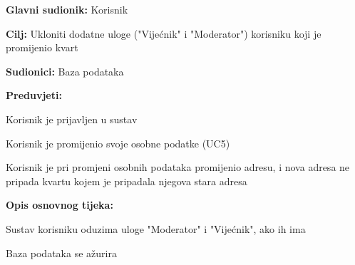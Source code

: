 					\noindent {}
					\begin{packed_item}
	
						\item \textbf{Glavni sudionik: }Korisnik
						\item  \textbf{Cilj:} Ukloniti dodatne uloge ("Vijećnik" i "Moderator") korisniku koji je promijenio kvart
						\item  \textbf{Sudionici:} Baza podataka
						\item  \textbf{Preduvjeti:}
						\item[] \begin{packed_enum}
							\item Korisnik je prijavljen u sustav
							\item Korisnik je promijenio svoje osobne podatke (UC5)
							\item Korisnik je pri promjeni osobnih podataka promijenio adresu, i nova adresa ne pripada kvartu kojem je pripadala njegova stara adresa
						\end{packed_enum}
						\item  \textbf{Opis osnovnog tijeka:}
						
						\item[] \begin{packed_enum}
	
							\item Sustav korisniku oduzima uloge "Moderator" i "Vijećnik", ako ih ima
							\item Baza podataka se ažurira
						\end{packed_enum}
					\end{packed_item}

